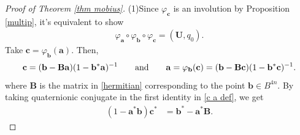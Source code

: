 \documentclass[a4paper,11pt]{amsart}
\numberwithin{equation}{section}
\begin{document}
\begin{proof}[Proof of Theorem \ref{thm mobius}]
(1)\;Since $\varphi_{\mathbf{c}}$ is an involution by Proposition \ref{multip}, it's equivalent to show
 \begin{equation}\begin{aligned}\label{abc}
\varphi_{\mathbf{a}}\circ\varphi_{\mathbf{b}}\circ\varphi_{\mathbf{c}}=(\mathbf{U},q_0).
\end{aligned}\end{equation}
Take $\mathbf{c}=\varphi_{\mathbf{b}}(\mathbf{a})$. Then,
\begin{equation}\begin{aligned}\label{c a def}
\mathbf{c}=(\mathbf{b}-\mathbf{B}\mathbf{\mathbf{a}})(1-\mathbf{b}^*\mathbf{a})^{-1}\qquad{\rm and}\qquad\mathbf{a}=\varphi_{\mathbf{b}}(\mathbf{c})=(\mathbf{b}-\mathbf{B}\mathbf{\mathbf{c}})(1-\mathbf{b}^*\mathbf{c})^{-1}.
\end{aligned}\end{equation}
where $\mathbf{B}$ is the matrix in \eqref{hermitian} corresponding to the point $\mathbf{b}\in B^{4n}$.
By taking quaternionic conjugate in the first identity in \eqref{c a def}, we get
\begin{equation}\begin{aligned}\label{def of c}
(1-\mathbf{a}^*\mathbf{b})\mathbf{c}^*&=\mathbf{b}^*-\mathbf{a}^*\mathbf{B}.
\end{aligned}\end{equation}



\end{proof}
\end{document}
